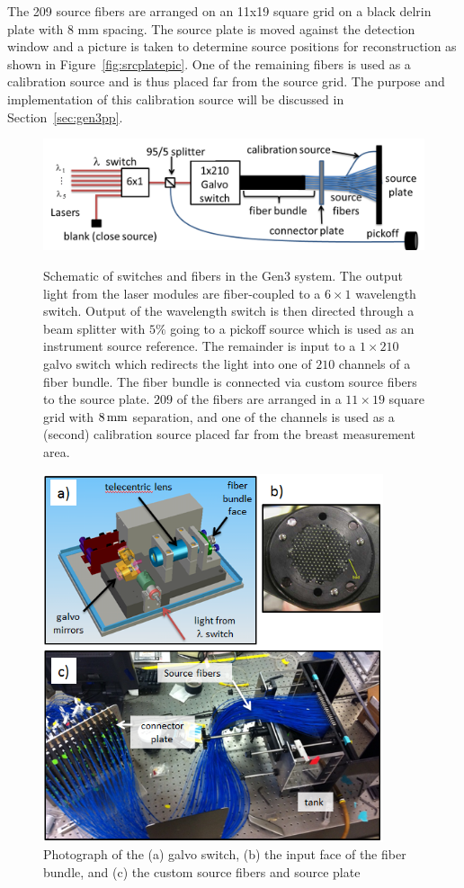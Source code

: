The 209 source fibers are arranged on an 11x19 square grid on a black delrin plate with 8 mm spacing. The source plate is moved against the detection window and a picture is taken to determine source positions for reconstruction as shown in Figure~\ref{fig:srcplatepic}. One of the remaining fibers is used as a calibration source and is thus placed far from the source grid. The purpose and implementation of this calibration source will be discussed in Section~\ref{sec:gen3pp}.
\begin{figure}[p]
\centering
\includegraphics[width=14cm]{./figures/4_Gen3/gen3switchschem.png}
\caption[Schematic of switches and fibers in the Gen3 system]{Schematic of switches and fibers in the Gen3 system. The output light from the laser modules are fiber-coupled to a $6\times 1$ wavelength switch. Output of the wavelength switch is then directed through a beam splitter with $5\%$ going to a pickoff source which is used as an instrument source reference. The remainder is input to a $1\times 210$ galvo switch which redirects the light into one of $210$ channels of a fiber bundle. The fiber bundle is connected via custom source fibers to the source plate. $209$ of the fibers are arranged in a $11\times 19$ square grid with $8\,{\rm mm}$ separation, and one of the channels is used as a (second) calibration source placed far from the breast measurement area.}
\label{fig:gen3switchschem}
\vspace{10mm}
\includegraphics[width=10cm]{./figures/4_Gen3/gen3switchpic.png}
\caption{Photograph of the (a) galvo switch, (b) the input face of the fiber bundle, and (c) the custom source fibers and source plate}
\label{fig:gen3switchpic}
\end{figure}
